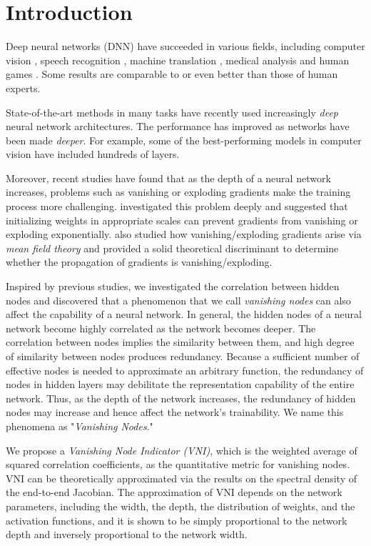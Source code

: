 \chapter{Introduction}
\label{c:intro}

Deep neural networks (DNN) have succeeded in various fields, including computer vision \cite{alexnet}, speech recognition \cite{speech}, machine translation \cite{google_trans}, medical analysis \cite{medical} and human games \cite{alphago}. Some results are comparable to or even better than those of human experts.


State-of-the-art methods in many tasks have recently used increasingly \textit{deep} neural network architectures. The performance has improved as networks have been made \textit{deeper}. For example, some of the best-performing models \cite{resnet1, resnet2} in computer vision have included hundreds of layers.

Moreover, recent studies have found that as the depth of a neural network increases, problems such as vanishing or exploding gradients make the training process more challenging. \cite{xavier, he} investigated this problem deeply and suggested that initializing weights in appropriate scales can prevent gradients from vanishing or exploding exponentially.
\cite{mft:expo, mft:info} also studied how vanishing/exploding gradients arise via \textit{mean field theory} and provided a solid theoretical discriminant to determine whether the propagation of gradients is vanishing/exploding. 

Inspired by previous studies, we investigated the correlation between hidden nodes and discovered that a phenomenon that we call \textit{vanishing nodes} can also affect the capability of a neural network.
In general, the hidden nodes of a neural network become highly correlated as the network becomes deeper.
The correlation between nodes implies the similarity between them, and high degree of similarity between nodes produces redundancy.
Because a sufficient number of effective nodes is needed to approximate an arbitrary function, the redundancy of nodes in hidden layers may debilitate the representation capability of the entire network.
Thus, as the depth of the network increases, the redundancy of hidden nodes may increase and hence affect the network's trainability. We name this phenomena as "\textit{Vanishing Nodes}."

We propose a \textit{Vanishing Node Indicator (VNI)}, which is the weighted average of squared correlation coefficients, as the quantitative metric for vanishing nodes. VNI can be theoretically approximated via the results on the spectral density of the end-to-end Jacobian. The approximation of  VNI depends on the network parameters, including the width, the depth, the distribution of weights, and the activation functions, and it is shown to be simply proportional to the network depth and inversely proportional to the network width.

